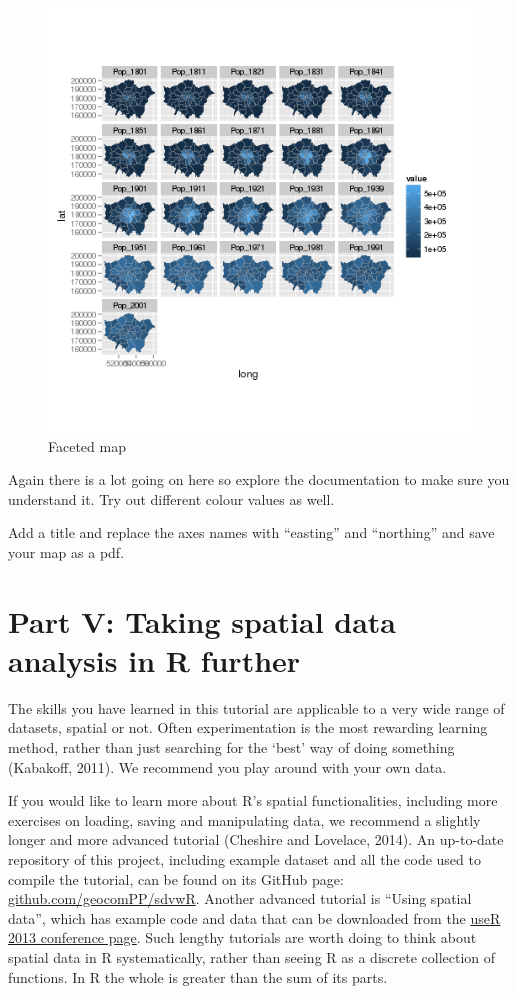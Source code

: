 \documentclass[]{article}
\begin{document}
\begin{figure}[htbp]
\centering
\includegraphics{figure/Faceted_map.png}
\caption{Faceted map}
\end{figure}

Again there is a lot going on here so explore the documentation to make
sure you understand it. Try out different colour values as well.

Add a title and replace the axes names with ``easting'' and ``northing''
and save your map as a pdf.

\section{Part V: Taking spatial data analysis in R
further}\label{part-v-taking-spatial-data-analysis-in-r-further}

The skills you have learned in this tutorial are applicable to a very
wide range of datasets, spatial or not. Often experimentation is the
most rewarding learning method, rather than just searching for the
`best' way of doing something (Kabakoff, 2011). We recommend you play
around with your own data.

If you would like to learn more about R's spatial functionalities,
including more exercises on loading, saving and manipulating data, we
recommend a slightly longer and more advanced tutorial (Cheshire and
Lovelace, 2014). An up-to-date repository of this project, including
example dataset and all the code used to compile the tutorial, can be
found on its GitHub page:
\href{https://github.com/geocomPP/sdvwR}{github.com/geocomPP/sdvwR}.
Another advanced tutorial is ``Using spatial data'', which has example
code and data that can be downloaded from the
\href{http://www.edii.uclm.es/~useR-2013//Tutorials/Bivand.html}{useR
2013 conference page}. Such lengthy tutorials are worth doing to think
about spatial data in R systematically, rather than seeing R as a
discrete collection of functions. In R the whole is greater than the sum
of its parts.
\end{document}
